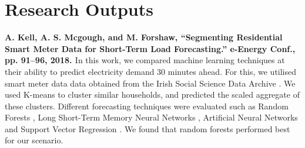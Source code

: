 \documentclass[12pt]{article}
\begin{document}
%





\clearpage

\clearpage

\section{Research Outputs}

\textbf{A. Kell, A. S. Mcgough, and M. Forshaw, ``Segmenting Residential Smart Meter Data for Short-Term Load Forecasting.'' e-Energy Conf., pp. 91--96, 2018. \cite{Kell2018}
}
In this work, we compared machine learning techniques at their ability to predict electricity demand 30 minutes ahead. For this, we utilised smart meter data data obtained from the Irish Social Science Data Archive \cite{cer_2012}. We used K-means \cite{Forgy65} to cluster similar households, and predicted the scaled aggregate of these clusters. Different forecasting techniques were evaluated such as Random Forests \cite{TinKamHo}, Long Short-Term Memory Neural Networks \cite{lstm}, Artificial Neural Networks \cite{book:984557} and Support Vector Regression \cite{Drucker1997}. We found that random forests performed best for our scenario.
\end{document}
